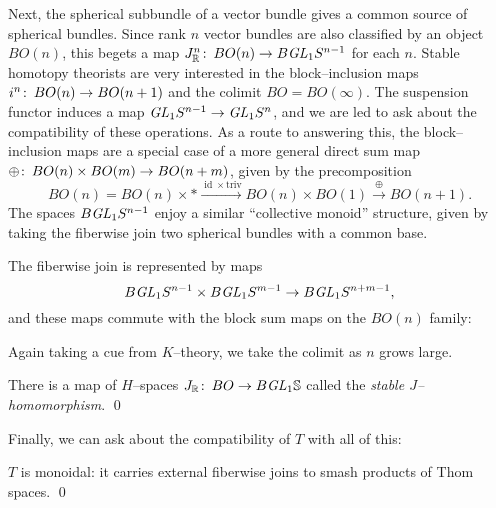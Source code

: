 Next, the spherical subbundle of a vector bundle gives a common source of spherical bundles.  Since rank $n$ vector bundles are also classified by an object $BO(n)$, this begets a map $J_{\mathbb R}^n\colon\thinspace BO(n) \to B \mathit{GL}_1 S^{n-1}$ for each $n$.  Stable homotopy theorists are very interested in the block--inclusion maps $i^n\colon\thinspace BO(n) \to BO(n+1)$ and the colimit $BO = BO(\infty)$.  The suspension functor induces a map $\mathit{GL}_1 S^{n-1} \to \mathit{GL}_1 S^n$, and we are led to ask about the compatibility of these operations.  As a route to answering this, the block--inclusion maps are a special case of a more general direct sum map $\oplus\colon\thinspace BO(n) \times BO(m) \to BO(n+m)$, given by the precomposition \[BO(n) = BO(n) \times * \xrightarrow{\operatorname{id} \times \text{triv}} BO(n) \times BO(1) \xrightarrow\oplus BO(n+1).\] The spaces $B \mathit{GL}_1 S^{n-1}$ enjoy a similar ``collective monoid'' structure, given by taking the fiberwise join two spherical bundles with a common base.
\begin{lemma}\label{JIsMonoidal}
The fiberwise join is represented by maps \[B\mathit{GL}_1 S^{n-1} \times B\mathit{GL}_1 S^{m-1} \to B\mathit{GL}_1 S^{n+m-1},\] and these maps commute with the block sum maps on the $BO(n)$ family:  
\begin{center}
\end{center}
\end{lemma}
\noindent Again taking a cue from $K$--theory, we take the colimit as $n$ grows large.
\begin{corollary}
There is a map of $H$--spaces $J_{\mathbb R}\colon\thinspace BO \to B\mathit{GL}_1 \mathbb S$ called the \textit{stable $J$--homomorphism}. \qed
\end{corollary}
\noindent Finally, we can ask about the compatibility of $T$ with all of this:
\begin{lemma}\label{ThomSpacesAreMonoidal}
$T$ is monoidal: it carries external fiberwise joins to smash products of Thom spaces. \qed
\end{lemma}


